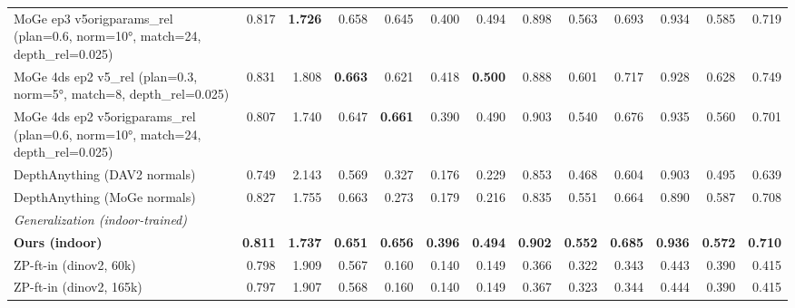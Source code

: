 \begin{table}[t]
{\begin{tabular}{l r r r r r r r r r r r r}
MoGe ep3 v5origparams\_rel (plan=0.6, norm=10°, match=24, depth\_rel=0.025) & 0.817 & \textbf{1.726} & 0.658 & 0.645 & 0.400 & 0.494 & 0.898 & 0.563 & 0.693 & 0.934 & 0.585 & 0.719 \\
MoGe 4ds ep2 v5\_rel (plan=0.3, norm=5°, match=8, depth\_rel=0.025) & 0.831 & 1.808 & \textbf{0.663} & 0.621 & 0.418 & \textbf{0.500} & 0.888 & 0.601 & 0.717 & 0.928 & 0.628 & 0.749 \\
MoGe 4ds ep2 v5origparams\_rel (plan=0.6, norm=10°, match=24, depth\_rel=0.025) & 0.807 & 1.740 & 0.647 & \textbf{0.661} & 0.390 & 0.490 & 0.903 & 0.540 & 0.676 & 0.935 & 0.560 & 0.701 \\
DepthAnything (DAV2 normals) & 0.749 & 2.143 & 0.569 & 0.327 & 0.176 & 0.229 & 0.853 & 0.468 & 0.604 & 0.903 & 0.495 & 0.639 \\
DepthAnything (MoGe normals) & 0.827 & 1.755 & 0.663 & 0.273 & 0.179 & 0.216 & 0.835 & 0.551 & 0.664 & 0.890 & 0.587 & 0.708 \\
\midrule
\multicolumn{13}{l}{\textit{Generalization (indoor-trained)}} \\
\textbf{Ours (indoor)} & \textbf{0.811} & \textbf{1.737} & \textbf{0.651} & \textbf{0.656} & \textbf{0.396} & \textbf{0.494} & \textbf{0.902} & \textbf{0.552} & \textbf{0.685} & \textbf{0.936} & \textbf{0.572} & \textbf{0.710} \\
ZP-ft-in (dinov2, 60k) & 0.798 & 1.909 & 0.567 & 0.160 & 0.140 & 0.149 & 0.366 & 0.322 & 0.343 & 0.443 & 0.390 & 0.415 \\
ZP-ft-in (dinov2, 165k) & 0.797 & 1.907 & 0.568 & 0.160 & 0.140 & 0.149 & 0.367 & 0.323 & 0.344 & 0.444 & 0.390 & 0.415 \\
\bottomrule
\end{tabular}%
}
\end{table}
